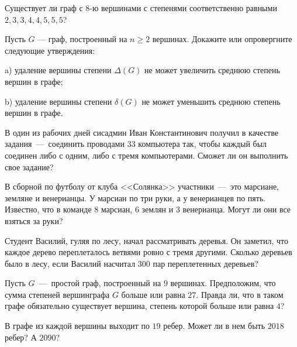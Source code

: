 \begin{exersize}
	Существует ли граф с $8$-ю вершинами с степенями соответственно равными $2, 3, 3, 4, 4, 5, 5, 5$?
\end{exersize}

\begin{exersize}
	Пусть $G$ --- граф, построенный на $n \geqslant 2$ вершинах. Докажите или 
	опровергните следующие утверждения:
	
	a) удаление вершины степени $\Delta (G)$ не может увеличить 
	среднюю степень вершин в графе;
	
	b) удаление вершины степени $\delta (G)$ не может уменьшить 
	среднюю степень вершин в графе.
\end{exersize}

\begin{exersize}
	В один из рабочих дней сисадмин Иван Константинович получил в качестве задания~---~соединить проводами $33$ компьютера так, 
	чтобы каждый был соединен либо с одним, либо с тремя компьютерами. Сможет ли он выполнить свое задание?
\end{exersize}

\begin{exersize}
	В сборной по футболу от клуба <<Солянка>> участники~---~это марсиане, земляне и венерианцы. У марсиан по три руки, а у венерианцев по пять. 
	Известно, что в команде $8$ марсиан, $6$ землян и $3$ венерианца. Могут ли они все взяться за руки?
\end{exersize}

\begin{exersize}
	Студент Василий, гуляя по лесу, начал рассматривать деревья. Он заметил, что каждое дерево переплеталось ветвями ровно с тремя другими. 
	Сколько деревьев было в лесу, если Василий насчитал $300$ пар переплетенных деревьев?
\end{exersize}

\begin{exersize}
	Пусть $G$~---~простой граф, построенный на $9$ вершинах. Предположим, что сумма 
	степеней вершинграфа $G$ больше или равна $27$. Правда ли, что в таком графе
	обязательно существует вершина, степень которой больше или равна $4$?
\end{exersize}

\begin{exersize}
	В графе из каждой вершины выходит по $19$ ребер. Может ли в нем быть $2018$ ребер? А $2090$?
\end{exersize}

